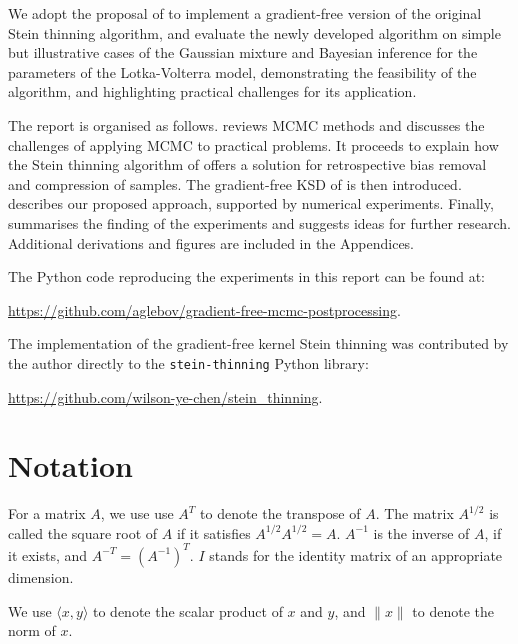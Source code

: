 \documentclass[11pt,a4paper]{report}
\begin{document}
We adopt the proposal of \cite{fisherGradientFreeKernelStein2024} to implement a gradient-free version of the original Stein thinning algorithm, and evaluate the newly developed algorithm on simple but illustrative cases of the Gaussian mixture and Bayesian inference for the parameters of the Lotka-Volterra model, demonstrating the feasibility of the algorithm, and highlighting practical challenges for its application.

The report is organised as follows.  reviews MCMC methods and discusses the challenges of applying MCMC to practical problems. It proceeds to explain how the Stein thinning algorithm of \cite{riabizOptimalThinningMCMC2022} offers a solution for retrospective bias removal and compression of samples. The gradient-free KSD of \cite{fisherGradientFreeKernelStein2024} is then introduced.  describes our proposed approach, supported by numerical experiments. Finally,  summarises the finding of the experiments and suggests ideas for further research. Additional derivations and figures are included in the Appendices.

The Python code reproducing the experiments in this report can be found at:
\begin{center}
\vspace{-10pt}
\url{https://github.com/aglebov/gradient-free-mcmc-postprocessing}.
\vspace{-10pt}
\end{center}
The implementation of the gradient-free kernel Stein thinning was contributed by the author directly to the \texttt{stein-thinning} Python library:
\begin{center}
\vspace{-10pt}
\url{https://github.com/wilson-ye-chen/stein_thinning}.
\end{center}

\chapter*{Notation}

For a matrix $A$, we use use $A^T$ to denote the transpose of $A$. The matrix $A^{1/2}$ is called the square root of $A$ if it satisfies $A^{1/2} A^{1/2} = A$. $A^{-1}$ is the inverse of $A$, if it exists, and $A^{-T} = (A^{-1})^T$. $I$ stands for the identity matrix of an appropriate dimension.

We use $\langle x, y \rangle$ to denote the scalar product of $x$ and $y$, and $\| x \|$ to denote the norm of $x$.
\end{document}

